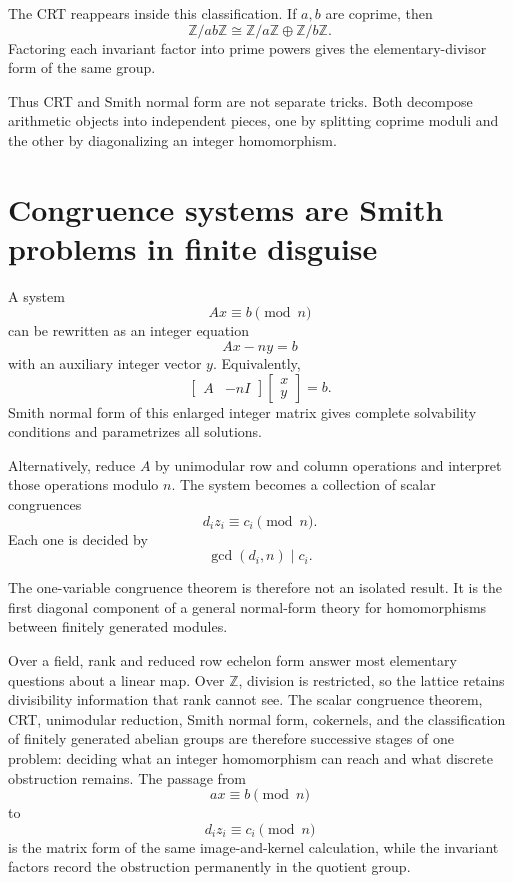 The CRT reappears inside this classification.  If \(a,b\) are coprime, then
\[
  \mathbb Z/ab\mathbb Z
  \cong
  \mathbb Z/a\mathbb Z
  \oplus
  \mathbb Z/b\mathbb Z.
\]
Factoring each invariant factor into prime powers gives the elementary-divisor form of the same group.

Thus CRT and Smith normal form are not separate tricks.  Both decompose arithmetic objects into independent pieces, one by splitting coprime moduli and the other by diagonalizing an integer homomorphism.

\section{Congruence systems are Smith problems in finite disguise}

A system
\[
  Ax\equiv b\pmod n
\]
can be rewritten as an integer equation
\[
  Ax-ny=b
\]
with an auxiliary integer vector \(y\).  Equivalently,
\[
  \begin{bmatrix}A&-nI\end{bmatrix}
  \begin{bmatrix}x\\y\end{bmatrix}
  =b.
\]
Smith normal form of this enlarged integer matrix gives complete solvability conditions and parametrizes all solutions.

Alternatively, reduce \(A\) by unimodular row and column operations and interpret those operations modulo \(n\).  The system becomes a collection of scalar congruences
\[
  d_i z_i\equiv c_i\pmod n.
\]
Each one is decided by
\[
  \gcd(d_i,n)\mid c_i.
\]

The one-variable congruence theorem is therefore not an isolated result.  It is the first diagonal component of a general normal-form theory for homomorphisms between finitely generated modules.

Over a field, rank and reduced row echelon form answer most elementary questions about a linear map.  Over \(\mathbb Z\), division is restricted, so the lattice retains divisibility information that rank cannot see.  The scalar congruence theorem, CRT, unimodular reduction, Smith normal form, cokernels, and the classification of finitely generated abelian groups are therefore successive stages of one problem: deciding what an integer homomorphism can reach and what discrete obstruction remains.  The passage from
\[
  ax\equiv b\pmod n
\]
to
\[
  d_i z_i\equiv c_i\pmod n
\]
is the matrix form of the same image-and-kernel calculation, while the invariant factors record the obstruction permanently in the quotient group.
